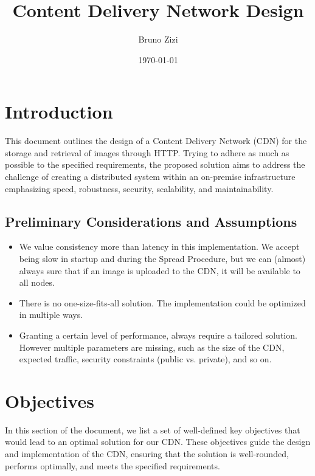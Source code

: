\documentclass{article}
\begin{document}
  \title{Content Delivery Network Design}
  \author{Bruno Zizi}
  \date{\today}

  \maketitle

  \tableofcontents

  \newpage

  \section{Introduction}
  This document outlines the design of a Content Delivery Network (CDN) for the storage and retrieval of images through
  HTTP.
  Trying to adhere as much as possible to the specified requirements, the proposed solution aims to address the
  challenge of creating a distributed system within an on-premise infrastructure emphasizing speed, robustness,
  security, scalability, and maintainability.


  \subsection{Preliminary Considerations and Assumptions}
  \begin{itemize}
    \item We value consistency more than latency in this implementation. We accept being slow in startup
     and during the Spread Procedure, but we can (almost) always sure that if an image is uploaded to the CDN, it
     will be available to all nodes.
    \item There is no one-size-fits-all solution. The implementation could be optimized in multiple ways.
    \item Granting a certain level of performance, always require a tailored solution. However multiple parameters
     are missing, such as the size of the CDN, expected traffic, security constraints (public vs. private), and so on.
  \end{itemize}


  \section{Objectives}

  In this section of the document, we list a set of well-defined key objectives that would lead to an optimal solution
  for our CDN. These objectives guide the design and implementation of the CDN,
  ensuring that the solution is well-rounded, performs optimally, and meets the specified requirements.
\end{document}
